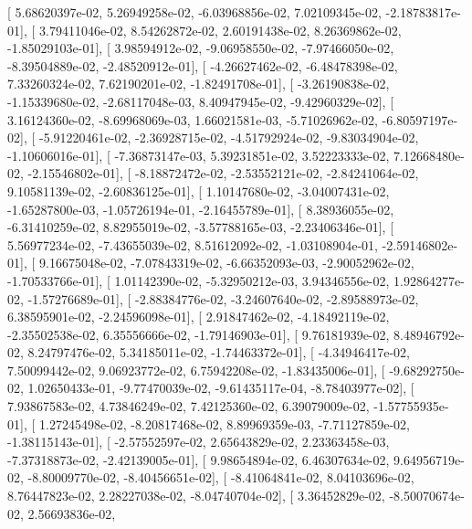 \documentclass{article}
\begin{document}
       [  5.68620397e-02,   5.26949258e-02,  -6.03968856e-02,
          7.02109345e-02,  -2.18783817e-01],
       [  3.79411046e-02,   8.54262872e-02,   2.60191438e-02,
          8.26369862e-02,  -1.85029103e-01],
       [  3.98594912e-02,  -9.06958550e-02,  -7.97466050e-02,
         -8.39504889e-02,  -2.48520912e-01],
       [ -4.26627462e-02,  -6.48478398e-02,   7.33260324e-02,
          7.62190201e-02,  -1.82491708e-01],
       [ -3.26190838e-02,  -1.15339680e-02,  -2.68117048e-03,
          8.40947945e-02,  -9.42960329e-02],
       [  3.16124360e-02,  -8.69968069e-03,   1.66021581e-03,
         -5.71026962e-02,  -6.80597197e-02],
       [ -5.91220461e-02,  -2.36928715e-02,  -4.51792924e-02,
         -9.83034904e-02,  -1.10606016e-01],
       [ -7.36873147e-03,   5.39231851e-02,   3.52223333e-02,
          7.12668480e-02,  -2.15546802e-01],
       [ -8.18872472e-02,  -2.53552121e-02,  -2.84241064e-02,
          9.10581139e-02,  -2.60836125e-01],
       [  1.10147680e-02,  -3.04007431e-02,  -1.65287800e-03,
         -1.05726194e-01,  -2.16455789e-01],
       [  8.38936055e-02,  -6.31410259e-02,   8.82955019e-02,
         -3.57788165e-03,  -2.23406346e-01],
       [  5.56977234e-02,  -7.43655039e-02,   8.51612092e-02,
         -1.03108904e-01,  -2.59146802e-01],
       [  9.16675048e-02,  -7.07843319e-02,  -6.66352093e-03,
         -2.90052962e-02,  -1.70533766e-01],
       [  1.01142390e-02,  -5.32950212e-03,   3.94346556e-02,
          1.92864277e-02,  -1.57276689e-01],
       [ -2.88384776e-02,  -3.24607640e-02,  -2.89588973e-02,
          6.38595901e-02,  -2.24596098e-01],
       [  2.91847462e-02,  -4.18492119e-02,  -2.35502538e-02,
          6.35556666e-02,  -1.79146903e-01],
       [  9.76181939e-02,   8.48946792e-02,   8.24797476e-02,
          5.34185011e-02,  -1.74463372e-01],
       [ -4.34946417e-02,   7.50099442e-02,   9.06923772e-02,
          6.75942208e-02,  -1.83435006e-01],
       [ -9.68292750e-02,   1.02650433e-01,  -9.77470039e-02,
         -9.61435117e-04,  -8.78403977e-02],
       [  7.93867583e-02,   4.73846249e-02,   7.42125360e-02,
          6.39079009e-02,  -1.57755935e-01],
       [  1.27245498e-02,  -8.20817468e-02,   8.89969359e-03,
         -7.71127859e-02,  -1.38115143e-01],
       [ -2.57552597e-02,   2.65643829e-02,   2.23363458e-03,
         -7.37318873e-02,  -2.42139005e-01],
       [  9.98654894e-02,   6.46307634e-02,   9.64956719e-02,
         -8.80009770e-02,  -8.40456651e-02],
       [ -8.41064841e-02,   8.04103696e-02,   8.76447823e-02,
          2.28227038e-02,  -8.04740704e-02],
       [  3.36452829e-02,  -8.50070674e-02,   2.56693836e-02,
\end{document}
